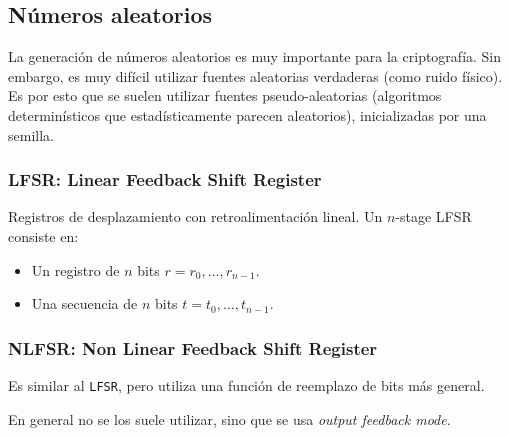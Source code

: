 \subsection{Números aleatorios}
La generación de números aleatorios es muy importante para la criptografía. Sin embargo, es muy difícil utilizar fuentes aleatorias verdaderas (como ruido físico). Es por esto que se suelen utilizar fuentes pseudo-aleatorias (algoritmos determinísticos que estadísticamente parecen aleatorios), inicializadas por una semilla. 

\subsubsection{LFSR: Linear Feedback Shift Register}
Registros de desplazamiento con retroalimentación lineal. Un $n$-stage LFSR consiste en:
\begin{itemize}
	\item Un registro de $n$ bits $r = r_0,\hdots,r_{n-1}$.
	\item Una secuencia de $n$ bits $t = t_0,\hdots,t_{n-1}$.
\end{itemize}


\subsubsection{NLFSR: Non Linear Feedback Shift Register}
Es similar al \texttt{LFSR}, pero utiliza una función de reemplazo de bits más general. 

En general no se los suele utilizar, sino que se usa \emph{output feedback mode}.




